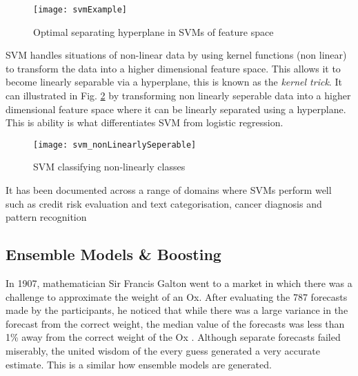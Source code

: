 \begin{figure}[H]
	\texttt{[image: svmExample]}
	\caption{Optimal separating hyperplane in SVMs of feature space \\
		\cite[Source:][]{li_adaptive_2011}
	}
	\label{fig:svmExample}
\end{figure}

SVM handles situations of non-linear data by using kernel functions (non linear) to transform the data into a higher dimensional feature space. This allows it to become linearly separable via a hyperplane, this is known as the \textit{kernel trick}. It can illustrated in Fig. \ref{fig:svm_nonLinearlySeperable} by transforming non linearly seperable data into a higher dimensional feature space where it can be linearly separated using a hyperplane. This is ability is what differentiates SVM from logistic regression.

\begin{figure}[H]
	\texttt{[image: svm\_nonLinearlySeperable]}
	\caption{SVM classifying non-linearly classes \\
		\cite[Source:][]{burges_tutorial_1998}
	}
	\label{fig:svm_nonLinearlySeperable}
\end{figure}

It has been documented across a range of domains where SVMs perform well such as credit risk evaluation \citep{van_gestel_credit_2009} and text categorisation, cancer diagnosis and pattern recognition \citep{shin_application_2005}

\subsection{Ensemble Models \& Boosting} \label{boosting}

In 1907, mathematician Sir Francis Galton went to a market in which there was a challenge
to approximate the weight of an Ox. After evaluating the 787 forecasts made by the
participants, he noticed that while there was a large variance in the forecast from the correct weight, the median value of the
forecasts was less than 1\% away from the correct weight of the Ox \citep{galton_vox_1907}. Although separate forecasts failed miserably, the united wisdom of the every guess generated a very accurate estimate. This is a similar how ensemble models are generated.


